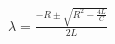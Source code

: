 \documentclass[preview]{standalone}
\begin{document}
\begin{center}
\(\lambda = \frac{-R \pm \sqrt{R^2 - \frac{4L}{C}}}{2L}\)
\end{center}
\end{document}
